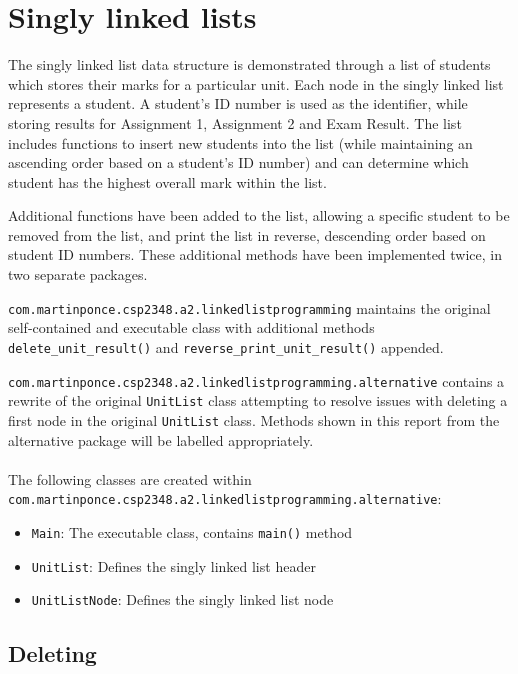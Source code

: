 \newpage
\section{Singly linked lists}

The singly linked list data structure is demonstrated through a list of students which stores their marks for a particular unit. Each node in the singly linked list represents a student. A student's ID number is used as the identifier, while storing results for Assignment 1, Assignment 2 and Exam Result. The list includes functions to insert new students into the list (while maintaining an ascending order based on a student's ID number) and can determine which student has the highest overall mark within the list.

Additional functions have been added to the list, allowing a specific student to be removed from the list, and print the list in reverse, descending order based on student ID numbers. These additional methods have been implemented twice, in two separate packages.

\texttt{com.martinponce.csp2348.a2.linkedlistprogramming} maintains the original self-contained and executable class with additional methods \texttt{delete_unit_result()} and \texttt{reverse_print_unit_result()} appended.

\texttt{com.martinponce.csp2348.a2.linkedlistprogramming.alternative} contains a rewrite of the original \texttt{UnitList} class attempting to resolve issues with deleting a first node in the original \texttt{UnitList} class. Methods shown in this report from the alternative package will be labelled appropriately.
\\
\\
The following classes are created within \\
\texttt{com.martinponce.csp2348.a2.linkedlistprogramming.alternative}:

\begin{itemize}
\item \texttt{Main}: The executable class, contains \texttt{main()} method
\item \texttt{UnitList}: Defines the singly linked list header
\item \texttt{UnitListNode}: Defines the singly linked list node
\end{itemize}

\newpage
\subsection{Deleting}

